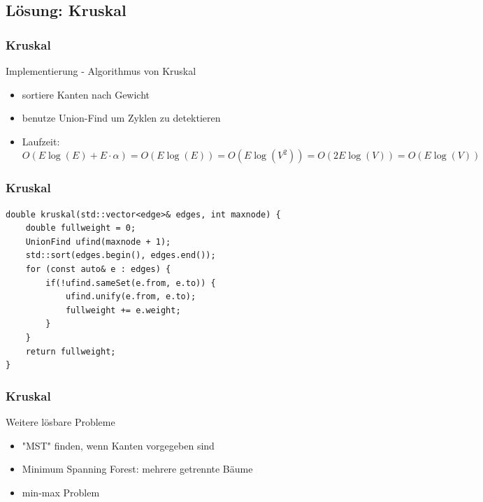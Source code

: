 \subsection{Lösung: Kruskal}

\begin{frame}
\frametitle{Kruskal}
\begin{block}{Implementierung - Algorithmus von Kruskal}
\begin{itemize}
\item sortiere Kanten nach Gewicht
\item benutze Union-Find um Zyklen zu detektieren
\item Laufzeit:\\
$O(E\log(E)+ E\cdot\alpha)=O(E\log(E))=O(E\log(V^2))=O(2E\log(V))=O(E\log(V))$
\end{itemize}
\end{block}
\end{frame}


\begin{frame}[fragile]
\frametitle{Kruskal}
\begin{lstlisting}[basicstyle=\footnotesize]
double kruskal(std::vector<edge>& edges, int maxnode) {
    double fullweight = 0;
    UnionFind ufind(maxnode + 1);
    std::sort(edges.begin(), edges.end());
    for (const auto& e : edges) {
        if(!ufind.sameSet(e.from, e.to)) {
            ufind.unify(e.from, e.to);
            fullweight += e.weight;
        }
    }
    return fullweight;
}
\end{lstlisting}
\end{frame}


\begin{frame}
\frametitle{Kruskal}
\begin{block}{Weitere lösbare Probleme}
\begin{itemize}
\item "MST" finden, wenn Kanten vorgegeben sind
\item Minimum Spanning Forest: mehrere getrennte Bäume
\item min-max Problem
\end{itemize}
\end{block}
\end{frame}
